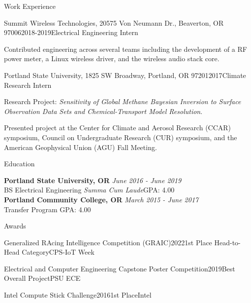 \documentclass{resume}
\begin{document}
\begin{rSection}{Work Experience}
\begin{rSubsection}{Summit Wireless Technologies, 20575 Von Neumann Dr., Beaverton, OR 97006}{2018-2019}{Electrical Engineering Intern}{}
\item Contributed engineering across several teams including the development of a RF power meter, a Linux wireless driver, and the wireless audio stack core. 
\end{rSubsection}

\begin{rSubsection}{Portland State University, 1825 SW Broadway, Portland, OR 97201}{2017}{Climate Research Intern}{}
\item Research Project: \textit{Sensitivity of Global Methane Bayesian Inversion to Surface Observation Data Sets and Chemical-Transport Model Resolution}.
\item Presented project at the Center for Climate and Aerosol Research (CCAR) symposium,
Council on Undergraduate Research (CUR) symposium, and the American Geophysical
Union (AGU) Fall Meeting.
\end{rSubsection}
\end{rSection}

\newpage

\begin{rSection}{Education}

{\bf Portland State University, OR} \hfill {\em June 2016 - June 2019} 
\\ BS Electrical Engineering \quad \textit{Summa Cum Laude}\hfill {GPA: 4.00}
\\{\bf Portland Community College, OR} \hfill {\em March 2015 - June 2017} 
\\ Transfer Program \hfill {GPA: 4.00}

\end{rSection}

\begin{rSection}{Awards}
\begin{rSubsectionEmpty}{Generalized RAcing Intelligence Competition (GRAIC)}{2022}{1st Place Head-to-Head Category}{CPS-IoT Week}\end{rSubsectionEmpty}

\begin{rSubsectionEmpty}{Electrical and Computer Engineering Capstone Poster Competition}{2019}{Best Overall Project}{PSU ECE}\end{rSubsectionEmpty}

\begin{rSubsectionEmpty}{Intel Compute Stick Challenge}{2016}{1st Place}{Intel}\end{rSubsectionEmpty}
\end{rSection}
\end{document}
